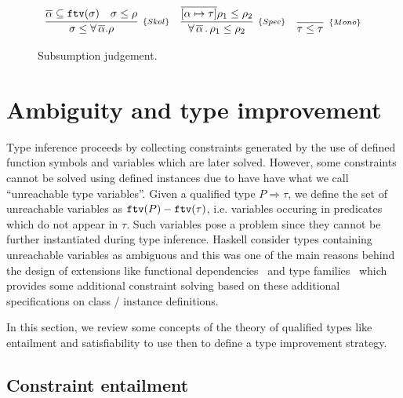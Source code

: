 \documentclass[a4paper, 11pt]{article}
\theoremstyle{definition}
\begin{document}
\begin{figure}[H]
\[
  \begin{array}{ccc} 
    \infer[_{\{Skol\}}] 
          {\sigma \leq \forall\,\overline{\alpha}.\rho}
          {\overline{\alpha}\subseteq \ftv(\sigma) & 
            \sigma \leq \rho}
    & 
    \infer[_{\{Spec\}}]
          {\forall\,\overline{\alpha}\,.\,\rho_1 \leq \rho_2} 
          {\overline{[\alpha\mapsto\tau]}\rho_1 \leq \rho_2}
    & 
    \infer[_{\{Mono\}}] 
          {\tau \leq \tau}
          {}
  \end{array}
\]
  \centering 
  \caption{Subsumption judgement.}
  \label{fig:subsumption}
\end{figure}





\section{Ambiguity and type improvement}

Type inference proceeds by collecting constraints generated 
by the use of defined function symbols and variables which 
are later solved. However, some constraints cannot be solved 
using defined instances due to have have what we call 
``unreachable type variables''. Given a qualified type 
$P \Rightarrow \tau$, we define the set of unreachable variables 
as $\mathtt{ftv}(P) - \mathtt{ftv}(\tau)$, i.e. variables occuring in predicates 
which do not appear in $\tau$. Such variables pose a problem 
since they cannot be further instantiated during type inference.
Haskell consider types containing unreachable variables as 
ambiguous and this was one of the main reasons behind the 
design of extensions like functional dependencies~\cite{Jones2000}
and type families~\cite{Chakravarty2005} which provides some additional 
constraint solving based on these additional specifications on 
class / instance definitions.

In this section, we review some concepts of the theory of 
qualified types like entailment and satisfiability to use then 
to define a type improvement strategy.

\subsection{Constraint entailment} 
\end{document}
